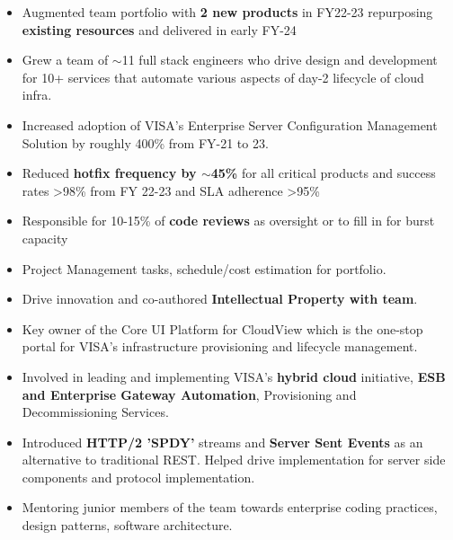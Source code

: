 \documentclass[10pt,a4paper,ragged2e,withhyper]{altacv}
\begin{document}
\begin{paracol}{2}
\begin{itemize}
  \item Augmented team portfolio with \textbf{2 new products} in FY22-23 repurposing \textbf{existing resources} and delivered in early FY-24
  \item Grew a team of \(\sim \)11 full stack engineers who drive design and development for 10+ services that automate various aspects of day-2 lifecycle of cloud infra.
  \item Increased adoption of VISA's Enterprise Server Configuration Management Solution by roughly 400\% from FY-21 to 23.
  \item Reduced \textbf{hotfix frequency by \(\sim \)45\%} for all critical products and success rates >98\% from FY 22-23 and SLA adherence >95\%
  \item Responsible for 10-15\% of \textbf{code reviews} as oversight or to fill in for burst capacity 
  \item Project Management tasks, schedule/cost estimation for portfolio.
  \item Drive innovation and co-authored \textbf{Intellectual Property with team}.
\end{itemize}

\divider

\begin{itemize}
  \item Key owner of the Core UI Platform for CloudView which is the one-stop portal for VISA’s infrastructure provisioning and lifecycle management.
  \item Involved in leading and implementing VISA’s \textbf{hybrid cloud} initiative, \textbf{ESB and Enterprise Gateway Automation}, Provisioning and Decommissioning Services.
  \item Introduced \textbf{HTTP/2 'SPDY'} streams and \textbf{Server Sent Events} as an alternative to traditional REST. Helped drive implementation for server side components and protocol implementation.
  \item Mentoring junior members of the team towards enterprise coding practices, design patterns, software architecture.
\end{itemize}

\divider


\end{paracol}
\end{document}
